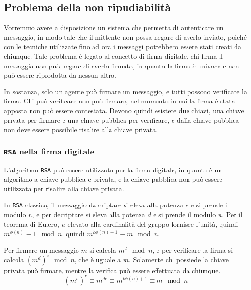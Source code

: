 \subsection{Problema della non ripudiabilità}
Vorremmo avere a disposizione un sistema che permetta di autenticare un messaggio, in modo tale che
il mittente non possa negare di averlo inviato, poiché con le tecniche utilizzate fino ad ora i messaggi 
potrebbero essere stati creati da chiunque. Tale problema è legato al concetto di firma digitale, chi firma 
il messaggio non può negare di averlo firmato, in quanto la firma è univoca e non può essere riprodotta da
nessun altro. 

In sostanza, solo un agente può firmare un messaggio, e tutti possono verificare la firma. Chi può verificare 
non può firmare, nel momento in cui la firma è stata apposta non può essere contestata.
Devono quindi esistere due chiavi, una chiave privata per firmare e una chiave pubblica per verificare, e 
dalla chiave pubblica non deve essere possibile risalire alla chiave privata.

\subsubsection{\texttt{RSA} nella firma digitale}
L'algoritmo \texttt{RSA} può essere utilizzato per la firma digitale, in quanto è un algoritmo a
chiave pubblica e privata, e la chiave pubblica non può essere utilizzata per risalire alla chiave privata.

In \texttt{RSA} classico, il messaggio da criptare si eleva alla potenza $e$ e si prende il modulo $n$, e 
per decriptare si eleva alla potenza $d$ e si prende il modulo $n$. Per il teorema di Eulero, $n$ elevato 
alla cardinalità del gruppo fornisce l'unità, quindi $m^{\phi(n)} \equiv 1 \mod n$, quindi $m^{k\phi(n) + 1}
\equiv m \mod n$.

Per firmare un messaggio $m$ si calcola $m^d \mod n$, e per verificare la firma si calcola $(m^d)^e \mod n$,
che è uguale a $m$. Solamente chi possiede la chiave privata può firmare, mentre la verifica può essere
effettuata da chiunque.
\[
  (m^d)^e \equiv m^{de} \equiv m^{k\phi(n) + 1} \equiv m \mod n
\]
